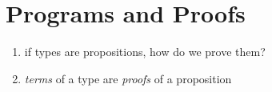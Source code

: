 \section{Programs and Proofs}
\begin{enumerate}
  \item if types are propositions, how do we prove them?
  \item \emph{terms} of a type are \emph{proofs} of a proposition
\end{enumerate}